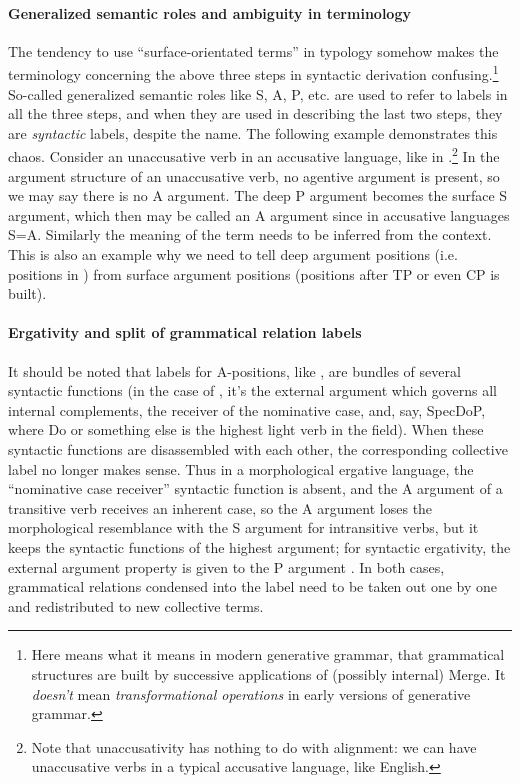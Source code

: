 {\paragraph{Generalized semantic roles and ambiguity in terminology} 
The tendency to use ``surface-orientated terms'' in typology 
somehow makes the terminology concerning the 
above three steps in syntactic derivation confusing.\footnote{
    Here  means what it means in modern generative grammar, 
    that grammatical structures are built by successive applications of (possibly internal) Merge.
    It \emph{doesn't} mean \emph{transformational operations}
    in early versions of generative grammar.
}
So-called generalized semantic roles like S, A, P, etc.
are used to refer to labels in all the three steps, 
and when they are used in describing the last two steps,
they are \emph{syntactic} labels, despite the name. 
The following example demonstrates this chaos.
Consider an unaccusative verb in an accusative language,
like  in .\footnote{
    Note that unaccusativity has nothing to do with alignment:
    we can have unaccusative verbs in a typical accusative language, like English.
} 
In the argument structure of an unaccusative verb,
no agentive argument is present,
so we may say there is no A argument. 
The deep P argument becomes the surface S argument,
which then may be called an A argument since in accusative languages S=A.
Similarly the meaning of the term 
needs to be inferred from the context.
This is also an example why we need to tell deep argument positions (i.e. positions in \vP{})
from surface argument positions (positions after TP or even CP is built).

\paragraph{Ergativity and split of grammatical relation labels}
It should be noted that labels for A-positions, like ,
are bundles of several syntactic functions
(in the case of , 
it's the external argument which governs all internal complements, 
the receiver of the nominative case, and, say, SpecDoP, 
where Do or something else is the highest light verb in the \vP{} field).
When these syntactic functions are disassembled with each other, 
the corresponding collective label no longer makes sense.
Thus in a morphological ergative language, 
the ``nominative case receiver'' syntactic function is absent, 
and the A argument of a transitive verb receives an inherent case, 
so the A argument loses the morphological resemblance with the 
S argument for intransitive verbs, 
but it keeps the syntactic functions of 
the highest argument; 
for syntactic ergativity, 
the external argument property is given to the P argument \citep{aldridge2008generative}.
In both cases, grammatical relations condensed into the label  
need to be taken out one by one and redistributed to new collective terms.

}
